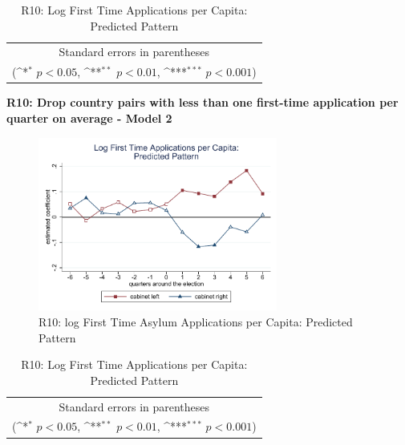 \documentclass[10pt,a4paper]{scrartcl}
\begin{document}
\begin{table}[!ht]\centering
	\renewcommand{\arraystretch}{1.25}
	\def\sym#1{\ifmmode^{#1}\else\(^{#1}\)\fi}
	\caption{R10: Log First Time Applications per Capita: Predicted Pattern}
	\begin{tabular}{l*{2}{c}}
		\hline\hline
		
		\hline\hline
		\multicolumn{3}{c}{\footnotesize Standard errors in parentheses} \\
		\multicolumn{3}{c}{\footnotesize (\sym{*} \(p<0.05\), \sym{**} \(p<0.01\), \sym{***} \(p<0.001\))}\\
	\end{tabular}
\end{table}

\clearpage
\textbf{R10: Drop country pairs with less than one first-time application per quarter on average - Model 2}
\begin{figure}[!ht]
	\centering
	\includegraphics[width=0.7\textwidth]{figures_edited/app_graph2_R10.pdf}
	\caption{R10: log First Time Asylum Applications per Capita: Predicted Pattern}
\end{figure}

\begin{table}[!ht]\centering
	\footnotesize
	\renewcommand{\arraystretch}{1.2}
	\def\sym#1{\ifmmode^{#1}\else\(^{#1}\)\fi}
	\caption{R10: Log First Time Applications per Capita: Predicted Pattern}
	\begin{tabular}{l*{2}{c}}
		\hline\hline
		
		\hline\hline
		\multicolumn{3}{c}{\footnotesize Standard errors in parentheses} \\
		\multicolumn{3}{c}{\footnotesize (\sym{*} \(p<0.05\), \sym{**} \(p<0.01\), \sym{***} \(p<0.001\))} \\
	\end{tabular}
\end{table}
\end{document}
